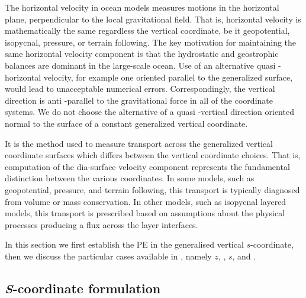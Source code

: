 \documentclass[../main/NEMO_manual]{subfiles}
\begin{document}
The horizontal velocity in ocean models measures motions in the horizontal plane,
perpendicular to the local gravitational field.
That is, horizontal velocity is mathematically the same regardless the vertical coordinate, be it geopotential,
isopycnal, pressure, or terrain following.
The key motivation for maintaining the same horizontal velocity component is that
the hydrostatic and geostrophic balances are dominant in the large-scale ocean.
Use of an alternative quasi -horizontal velocity, for example one oriented parallel to the generalized surface,
would lead to unacceptable numerical errors.
Correspondingly, the vertical direction is anti -parallel to the gravitational force in
all of the coordinate systems.
We do not choose the alternative of a quasi -vertical direction oriented normal to
the surface of a constant generalized vertical coordinate.

It is the method used to measure transport across the generalized vertical coordinate surfaces which differs between
the vertical coordinate choices.
That is, computation of the dia-surface velocity component represents the fundamental distinction between
the various coordinates.
In some models, such as geopotential, pressure, and terrain following, this transport is typically diagnosed from
volume or mass conservation.
In other models, such as isopycnal layered models, this transport is prescribed based on assumptions about
the physical processes producing a flux across the layer interfaces.

In this section we first establish the PE in the generalised vertical $s$-coordinate,
then we discuss the particular cases available in \NEMO, namely $z$, \zstar, $s$, and \ztilde.

\subsection{\textit{S}-coordinate formulation}
\end{document}
